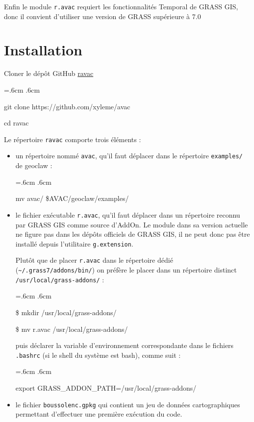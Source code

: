 \documentclass[12pt,oneside]{paper}
\newenvironment{code}{%
\vspace{2mm}%
\hangindent=.6cm%
\parindent.6cm%
\ttfamily%
\color{gris.3}%
}{
\vspace{2mm}%
}
\begin{document}
Enfin le module \verb+r.avac+ requiert les fonctionnalités Temporal de GRASS GIS, donc il convient d'utiliser une version de GRASS supérieure à 7.0

\section{Installation}

Cloner le dépôt GitHub \href{https://github.com/xyleme/ravac}{ravac}

\begin{code}
git clone https://github.com/xyleme/avac

cd ravac
\end{code}

Le répertoire \texttt{ravac} comporte trois éléments :
\begin{itemize}
\item un répertoire nommé \verb+avac+, qu'il faut déplacer dans le répertoire \verb+examples/+ de geoclaw :

\begin{code}
mv avac/ \$AVAC/geoclaw/examples/
\end{code}

\item le fichier exécutable \verb+r.avac+, qu'il faut déplacer dans un répertoire reconnu par GRASS GIS comme source d'AddOn. Le module dans sa version actuelle ne figure pas dans les dépôts officiels de GRASS GIS, il ne peut donc pas être installé depuis l'utilitaire \texttt{g.extension}.

Plutôt que de placer \verb+r.avac+ dans le répertoire dédié (\texttt{\textasciitilde/.grass7/addons/bin/}) on préfère le placer dans un répertoire distinct \texttt{/usr/local/grass-addons/} :

\begin{code}
\$ mkdir /usr/local/grass-addons/

\$ mv r.avac /usr/local/grass-addons/
\end{code}

puis déclarer la variable d'environnement correspondante dans le fichiers \texttt{.bashrc} (si le shell du système est bash), comme suit :

\begin{code}
export GRASS\_ADDON\_PATH=/usr/local/grass-addons/
\end{code}

\item le fichier \texttt{boussolenc.gpkg} qui contient un jeu de données cartographiques permettant d'effectuer une première exécution du code.
\end{itemize}
\end{document}
